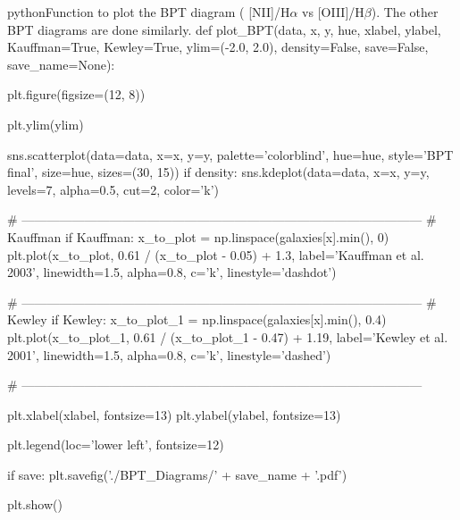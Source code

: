 \documentclass[letterpaper, oneside]{article}
\begin{document}
	\begin{sourcecode}[\label{bpt_function}]{python}{Function to plot the BPT diagram ( [NII]/H$\alpha$ vs [OIII]/H$\beta$). The other BPT diagrams are done similarly.}
	def plot_BPT(data, x, y, hue, xlabel, ylabel, 
	Kauffman=True, Kewley=True, 
	ylim=(-2.0, 2.0), 
	density=False, 
	save=False, save_name=None):
	
	plt.figure(figsize=(12, 8))
	
	plt.ylim(ylim)
	
	sns.scatterplot(data=data, x=x, y=y, palette='colorblind', 
	hue=hue, style='BPT final', size=hue, sizes=(30, 15))
	if density:
	sns.kdeplot(data=data, x=x, y=y, levels=7, alpha=0.5, cut=2, color='k')
	
	# ------------------------------------------------------------------------------------------------
	# Kauffman
	if Kauffman:
	x_to_plot = np.linspace(galaxies[x].min(), 0)
	plt.plot(x_to_plot, 0.61 / (x_to_plot - 0.05) + 1.3, label='Kauffman et al. 2003', 
	linewidth=1.5, alpha=0.8, c='k', linestyle='dashdot')
	
	# ------------------------------------------------------------------------------------------------
	# Kewley
	if Kewley:
	x_to_plot_1 = np.linspace(galaxies[x].min(), 0.4)
	plt.plot(x_to_plot_1, 0.61 / (x_to_plot_1 - 0.47) + 1.19, label='Kewley et al. 2001', 
	linewidth=1.5, alpha=0.8, c='k', linestyle='dashed')
	
	# ------------------------------------------------------------------------------------------------
	
	plt.xlabel(xlabel, fontsize=13)
	plt.ylabel(ylabel, fontsize=13)
	
	plt.legend(loc='lower left', fontsize=12)
	
	if save:
	plt.savefig('./BPT_Diagrams/' + save_name + '.pdf')
	
	plt.show()
	\end{sourcecode}
\end{document}
